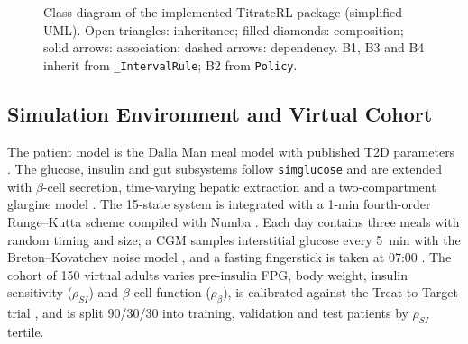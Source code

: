 \documentclass[conference]{IEEEtran}
\begin{document}
\begin{figure}[t]
{}
\caption{Class diagram of the implemented TitrateRL package (simplified UML). Open triangles:
inheritance; filled diamonds: composition; solid arrows: association; dashed arrows:
dependency. B1, B3 and B4 inherit from \texttt{\_IntervalRule}; B2 from \texttt{Policy}.}
\label{fig:classes}
\end{figure}

\subsection{Simulation Environment and Virtual Cohort}
The patient model is the Dalla Man meal model with published T2D parameters
\cite{dallaman2007,dallaman2007gim}. The glucose, insulin and gut subsystems follow
\texttt{simglucose} \cite{simglucose} and are extended with $\beta$-cell secretion,
time-varying hepatic extraction and a two-compartment glargine model
\cite{schiavon2020,lepore2000}. The 15-state system is integrated with a 1-min fourth-order
Runge--Kutta scheme compiled with Numba \cite{lam2015}. Each day contains three meals with random
timing and size; a CGM samples interstitial glucose every 5~min with the Breton--Kovatchev noise
model \cite{breton2008}, and a fasting fingerstick is taken at 07:00 \cite{iso15197}. The cohort
of 150 virtual adults varies pre-insulin FPG, body weight, insulin sensitivity ($\rho_{SI}$) and
$\beta$-cell function ($\rho_\beta$), is calibrated against the Treat-to-Target trial
\cite{riddle2003}, and is split 90/30/30 into training, validation and test patients by
$\rho_{SI}$ tertile.
\end{document}
